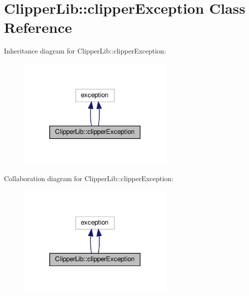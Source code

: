 \hypertarget{classClipperLib_1_1clipperException}{}\section{Clipper\+Lib\+:\+:clipper\+Exception Class Reference}
\label{classClipperLib_1_1clipperException}


Inheritance diagram for Clipper\+Lib\+:\+:clipper\+Exception\+:
\nopagebreak
\begin{figure}[H]
\begin{center}
\leavevmode
\includegraphics[width=218pt]{classClipperLib_1_1clipperException__inherit__graph}
\end{center}
\end{figure}


Collaboration diagram for Clipper\+Lib\+:\+:clipper\+Exception\+:
\nopagebreak
\begin{figure}[H]
\begin{center}
\leavevmode
\includegraphics[width=218pt]{classClipperLib_1_1clipperException__coll__graph}
\end{center}
\end{figure}
